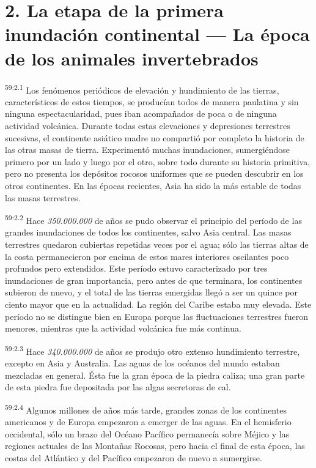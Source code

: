 \section*{2. La etapa de la primera inundación continental --- La época de los animales invertebrados}
\par
\textsuperscript{59:2.1} Los fenómenos periódicos de elevación y hundimiento de las tierras, característicos de estos tiempos, se producían todos de manera paulatina y sin ninguna espectacularidad, pues iban acompañados de poca o de ninguna actividad volcánica. Durante todas estas elevaciones y depresiones terrestres sucesivas, el continente asiático madre no compartió por completo la historia de las otras masas de tierra. Experimentó muchas inundaciones, sumergiéndose primero por un lado y luego por el otro, sobre todo durante su historia primitiva, pero no presenta los depósitos rocosos uniformes que se pueden descubrir en los otros continentes. En las épocas recientes, Asia ha sido la más estable de todas las masas terrestres.

\par
\textsuperscript{59:2.2} Hace \textit{350.000.000} de años se pudo observar el principio del período de las grandes inundaciones de todos los continentes, salvo Asia central. Las masas terrestres quedaron cubiertas repetidas veces por el agua; sólo las tierras altas de la costa permanecieron por encima de estos mares interiores oscilantes poco profundos pero extendidos. Este período estuvo caracterizado por tres inundaciones de gran importancia, pero antes de que terminara, los continentes subieron de nuevo, y el total de las tierras emergidas llegó a ser un quince por ciento mayor que en la actualidad. La región del Caribe estaba muy elevada. Este período no se distingue bien en Europa porque las fluctuaciones terrestres fueron menores, mientras que la actividad volcánica fue más continua.

\par
\textsuperscript{59:2.3} Hace \textit{340.000.000} de años se produjo otro extenso hundimiento terrestre, excepto en Asia y Australia. Las aguas de los océanos del mundo estaban mezcladas en general. Ésta fue la gran época de la piedra caliza; una gran parte de esta piedra fue depositada por las algas secretoras de cal.

\par
\textsuperscript{59:2.4} Algunos millones de años más tarde, grandes zonas de los continentes americanos y de Europa empezaron a emerger de las aguas. En el hemisferio occidental, sólo un brazo del Océano Pacífico permanecía sobre Méjico y las regiones actuales de las Montañas Rocosas, pero hacia el final de esta época, las costas del Atlántico y del Pacífico empezaron de nuevo a sumergirse.


